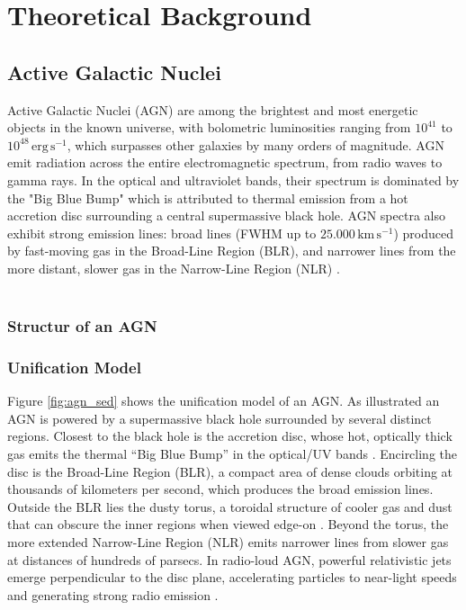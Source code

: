 \chapter{Theoretical Background}

\section{Active Galactic Nuclei}

Active Galactic Nuclei (AGN) are among the brightest and most energetic objects in the known universe, with bolometric luminosities ranging from $10^{41}$ to $10^{48}\,\mathrm{erg\,s^{-1}}$, which surpasses other galaxies by many orders of magnitude. AGN emit radiation across the entire electromagnetic spectrum, from radio waves to gamma rays. In the optical and ultraviolet bands, their spectrum is dominated by the "Big Blue Bump" which is attributed to thermal emission from a hot accretion disc surrounding a central supermassive black hole. AGN spectra also exhibit strong emission lines: broad lines (FWHM up to $25.000\,\mathrm{km\,s^{-1}}$) produced by fast-moving gas in the Broad-Line Region (BLR), and narrower lines from the more distant, slower gas in the Narrow-Line Region (NLR) \parencite{peterson1997introduction}.\\\\

\subsection{Structur of an AGN}



\subsection{Unification Model}
Figure \ref{fig:agn_sed} shows the unification model of an AGN. 
As illustrated an AGN is powered by a supermassive black hole surrounded by several distinct regions. Closest to the black hole is the accretion disc, whose hot, optically thick gas emits the thermal “Big Blue Bump” in the optical/UV bands \parencite{peterson1997introduction}. Encircling the disc is the Broad-Line Region (BLR), a compact area of dense clouds orbiting at thousands of kilometers per second, which produces the broad emission lines. Outside the BLR lies the dusty torus, a toroidal structure of cooler gas and dust that can obscure the inner regions when viewed edge-on \parencite{antonucci1993unified}. Beyond the torus, the more extended Narrow-Line Region (NLR) emits narrower lines from slower gas at distances of hundreds of parsecs. In radio-loud AGN, powerful relativistic jets emerge perpendicular to the disc plane, accelerating particles to near-light speeds and generating strong radio emission \parencite{urry1995unified}.


